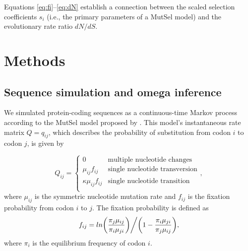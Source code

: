 \documentclass[11pt]{article}
\begin{document}
Equations \eqref{eq:fi}--\eqref{eq:dN} establish a connection between the scaled selection coefficients $s_i$ (i.e., the primary parameters of a MutSel model) and the evolutionary rate ratio $dN/dS$. 



\section*{Methods}

\subsection*{Sequence simulation and omega inference}
We simulated protein-coding sequences as a continuous-time Markov
process \cite{Yang2006} according to the MutSel model proposed by \cite{HalpernBruno1998}. This model's instantaneous rate matrix $Q = q_{ij}$, which describes the probability of substitution from codon $i$ to codon $j$, is given by 

\begin{equation}
Q_{ij} = \left\{ \begin{array}{rl}
              0                                           &\mbox{multiple nucleotide changes} \\
              \mu_{ij}f_{ij}                          &\mbox{single nucleotide transversion} \\
              \kappa\mu_{ij}f_{ij}               &\mbox{single nucleotide transition} \\
         \end{array} \right.,
\end{equation} where $\mu_{ij}$ is the symmetric nucleotide mutation rate and $f_{ij}$ is the fixation probability from codon $i$ to $j$. The fixation probability is defined as \begin{equation}f_{ij} = ln\bigg{(}\frac{\pi_j\mu_{ij}}{\pi_i\mu_{ji}}\bigg{)}\bigg{/}\bigg{(}1 - \frac{\pi_i\mu_{ji}}{\pi_j\mu_{ij}}\bigg{)},\end{equation} where $\pi_i$ is the equilibrium frequency of codon $i$.
\end{document}
